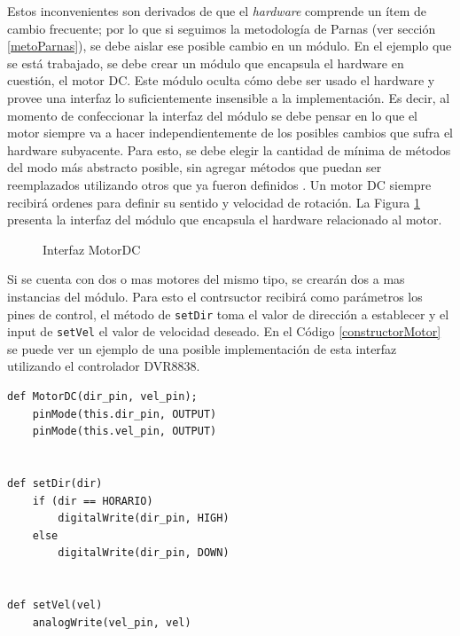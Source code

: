 Estos inconvenientes son derivados de que el \textit{hardware} comprende un ítem de cambio frecuente; por lo que si seguimos la metodología de Parnas (ver sección \ref{metoParnas}), se debe aislar ese posible cambio en un módulo. En el ejemplo que se está trabajado, se debe crear un módulo que encapsula el hardware en cuestión, el motor \gls{DC}. Este módulo oculta cómo debe ser usado el hardware y provee una interfaz lo suficientemente insensible a la implementación. Es decir, al momento de confeccionar la interfaz del módulo se debe pensar en lo que el motor siempre va a hacer independientemente de los posibles cambios que sufra el hardware subyacente. Para esto, se debe elegir la cantidad de mínima de métodos del modo más abstracto posible, sin agregar métodos que puedan ser reemplazados utilizando otros que ya fueron definidos \cite{Parnas02, parnas1977abstract}.
Un motor \gls{DC} siempre recibirá ordenes para definir su sentido y velocidad de rotación. La Figura \ref{interfazMotor} presenta la interfaz del módulo \MotorDC que encapsula el hardware relacionado al motor.

\begin{figure}[H]
\caption{Interfaz MotorDC}
\label{interfazMotor}
\begin{center}
\end{center}
\end{figure}

Si se cuenta con dos o mas motores del mismo tipo, se crearán dos a mas instancias del módulo. Para esto el contrsuctor recibirá como parámetros los pines de control, el método de \verb|setDir| toma el valor de dirección a establecer y el input de \verb|setVel| el valor de velocidad deseado. En el Código \ref{constructorMotor} se puede ver un ejemplo de una posible implementación de esta interfaz utilizando el controlador \gls{DVR8838}.

\begin{lstlisting}[caption=Posible implementación de la interfaz del módulo MotorDC.,label={constructorMotor}]
def MotorDC(dir_pin, vel_pin);
    pinMode(this.dir_pin, OUTPUT)
    pinMode(this.vel_pin, OUTPUT)


def setDir(dir) 
    if (dir == HORARIO)
        digitalWrite(dir_pin, HIGH)
    else
        digitalWrite(dir_pin, DOWN)
        

def setVel(vel)
    analogWrite(vel_pin, vel)

\end{lstlisting}

